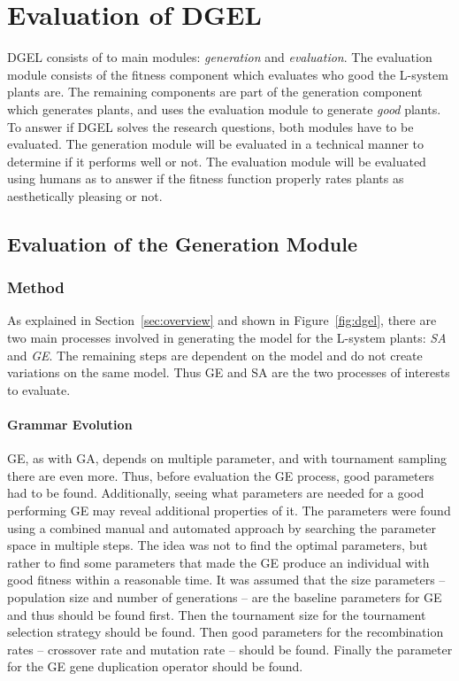 \chapter{Evaluation of DGEL}
DGEL consists of to main modules: \textit{generation} and \textit{evaluation}.
The evaluation module consists of the fitness component which evaluates who good the L-system plants are.
The remaining components are part of the generation component which generates plants, and uses the evaluation module to generate \textit{good} plants.
To answer if DGEL solves the research questions, both modules have to be evaluated.
The generation module will be evaluated in a technical manner to determine if it performs well or not.
The evaluation module will be evaluated using humans as to answer if the fitness function properly rates plants as aesthetically pleasing or not.

\section{Evaluation of the Generation Module}
\subsection{Method}
As explained in Section~\ref{sec:overview} and shown in Figure~\ref{fig:dgel}, there are two main processes involved in generating the model for the L-system plants: \textit{SA} and \textit{GE}.
The remaining steps are dependent on the model and do not create variations on the same model.
Thus GE and SA are the two processes of interests to evaluate.


\subsubsection{Grammar Evolution}
GE, as with GA, depends on multiple parameter, and with tournament sampling there are even more.
Thus, before evaluation the GE process, good parameters had to be found.
Additionally, seeing what parameters are needed for a good performing GE may reveal additional properties of it.
The parameters were found using a combined manual and automated approach by searching the parameter space in multiple steps.
The idea was not to find the optimal parameters, but rather to find some parameters that made the GE produce an individual with good fitness within a reasonable time.
It was assumed that the size parameters -- population size and number of generations -- are the baseline parameters for GE and thus should be found first.
Then the tournament size for the tournament selection strategy should be found.
Then good parameters for the recombination rates -- crossover rate and mutation rate -- should be found.
Finally the parameter for the GE gene duplication operator should be found.

